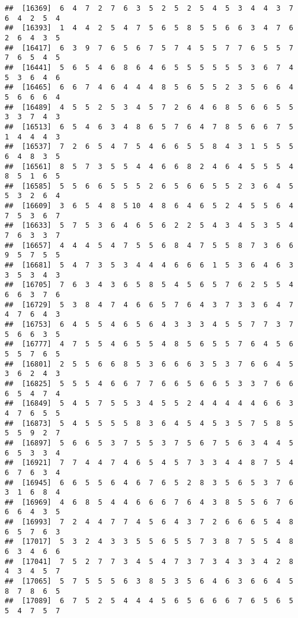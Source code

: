 \documentclass[
]{book}
\begin{document}
\begin{verbatim}
##  [16369]  6  4  7  2  7  6  3  5  2  5  2  5  4  5  3  4  4  3  7  6  4  2  5  4
##  [16393]  1  4  4  2  5  4  7  5  6  5  8  5  5  6  6  3  4  7  6  2  6  4  3  5
##  [16417]  6  3  9  7  6  5  6  7  5  7  4  5  5  7  7  6  5  5  7  7  6  5  4  5
##  [16441]  5  6  5  4  6  8  6  4  6  5  5  5  5  5  5  3  6  7  4  5  3  6  4  6
##  [16465]  6  6  7  4  6  4  4  4  8  5  6  5  5  2  3  5  6  6  4  5  6  6  6  4
##  [16489]  4  5  5  2  5  3  4  5  7  2  6  4  6  8  5  6  6  5  5  3  3  7  4  3
##  [16513]  6  5  4  6  3  4  8  6  5  7  6  4  7  8  5  6  6  7  5  1  4  4  4  3
##  [16537]  7  2  6  5  4  7  5  4  6  6  5  5  8  4  3  1  5  5  5  6  4  8  3  5
##  [16561]  8  5  7  3  5  5  4  4  6  6  8  2  4  6  4  5  5  5  4  8  5  1  6  5
##  [16585]  5  5  6  6  5  5  5  2  6  5  6  6  5  5  2  3  6  4  5  5  3  2  6  4
##  [16609]  3  6  5  4  8  5 10  4  8  6  4  6  5  2  4  5  5  6  4  7  5  3  6  7
##  [16633]  5  7  5  3  6  4  6  5  6  2  2  5  4  3  4  5  3  5  4  7  6  3  3  7
##  [16657]  4  4  4  5  4  7  5  5  6  8  4  7  5  5  8  7  3  6  6  9  5  7  5  5
##  [16681]  5  4  7  3  5  3  4  4  4  6  6  6  1  5  3  6  4  6  3  3  5  3  4  3
##  [16705]  7  6  3  4  3  6  5  8  5  4  5  6  5  7  6  2  5  5  4  6  6  3  7  6
##  [16729]  5  3  8  4  7  4  6  6  5  7  6  4  3  7  3  3  6  4  7  4  7  6  4  3
##  [16753]  6  4  5  5  4  6  5  6  4  3  3  3  4  5  5  7  7  3  7  5  6  6  3  5
##  [16777]  4  7  5  5  4  6  5  5  4  8  5  6  5  5  7  6  4  5  6  5  5  7  6  5
##  [16801]  2  5  5  6  6  8  5  3  6  6  6  3  5  3  7  6  6  4  5  3  6  2  4  3
##  [16825]  5  5  5  4  6  6  7  7  6  6  5  6  6  5  3  3  7  6  6  6  5  4  7  4
##  [16849]  5  4  5  7  5  5  3  4  5  5  2  4  4  4  4  4  6  6  3  4  7  6  5  5
##  [16873]  5  4  5  5  5  5  8  3  6  4  5  4  5  3  5  7  5  8  5  5  5  9  2  7
##  [16897]  5  6  6  5  3  7  5  5  3  7  5  6  7  5  6  3  4  4  5  6  5  3  3  4
##  [16921]  7  7  4  4  7  4  6  5  4  5  7  3  3  4  4  8  7  5  4  6  7  6  3  4
##  [16945]  6  6  5  5  6  4  6  7  6  5  2  8  3  5  6  5  3  7  6  3  1  6  8  4
##  [16969]  4  6  8  5  4  4  6  6  6  7  6  4  3  8  5  5  6  7  6  6  6  4  3  5
##  [16993]  7  2  4  4  7  7  4  5  6  4  3  7  2  6  6  6  5  4  8  6  5  7  6  3
##  [17017]  5  3  2  4  3  3  5  5  6  5  5  7  3  8  7  5  5  4  8  6  3  4  6  6
##  [17041]  7  5  2  7  7  3  4  5  4  7  3  7  3  4  3  3  4  2  8  4  3  4  5  7
##  [17065]  5  7  5  5  5  6  3  8  5  3  5  6  4  6  3  6  6  4  5  8  7  8  6  5
##  [17089]  6  7  5  2  5  4  4  4  5  6  5  6  6  6  7  6  5  6  5  5  4  7  5  7

\end{verbatim}
\end{document}
